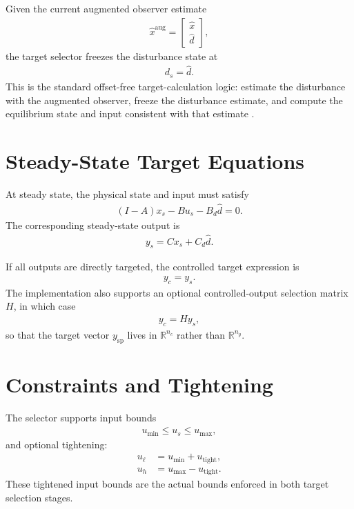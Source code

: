 \documentclass[11pt]{article}
\newcommand{\R}{\mathbb{R}}
\newcommand{\xs}{x_s}
\newcommand{\us}{u_s}
\newcommand{\ds}{d_s}
\newcommand{\ysp}{y_{\mathrm{sp}}}
\newcommand{\yexpr}{y_s}
\newcommand{\yctrl}{y_c}
\newcommand{\dhat}{\hat d}
\newcommand{\xhataug}{\hat x^{\mathrm{aug}}}
\begin{document}
Given the current augmented observer estimate
\begin{align}
    \xhataug = \begin{bmatrix} \hat x \\ \hat d \end{bmatrix},
\end{align}
the target selector freezes the disturbance state at
\begin{align}
    \ds = \dhat.
\end{align}
This is the standard offset-free target-calculation logic: estimate the
disturbance with the augmented observer, freeze the disturbance estimate, and
compute the equilibrium state and input consistent with that estimate
\cite{PannocchiaBemporad2007,MaederMorari2010,PannocchiaECC2015}.

\section{Steady-State Target Equations}
At steady state, the physical state and input must satisfy
\begin{align}
    (I-A)\xs - B\us - B_d \dhat = 0.
    \label{eq:ss_dyn}
\end{align}
The corresponding steady-state output is
\begin{align}
    \yexpr = C \xs + C_d \dhat.
    \label{eq:ss_output}
\end{align}

If all outputs are directly targeted, the controlled target expression is
\begin{align}
    \yctrl = \yexpr.
\end{align}
The implementation also supports an optional controlled-output selection matrix
$H$, in which case
\begin{align}
    \yctrl = H \yexpr,
\end{align}
so that the target vector $\ysp$ lives in $\R^{n_c}$ rather than $\R^{n_y}$.

\section{Constraints and Tightening}
The selector supports input bounds
\begin{align}
    u_{\min} \le \us \le u_{\max},
\end{align}
and optional tightening:
\begin{align}
    u_{\ell} &= u_{\min} + u_{\mathrm{tight}}, \\
    u_h &= u_{\max} - u_{\mathrm{tight}}.
\end{align}
These tightened input bounds are the actual bounds enforced in both target
selection stages.
\end{document}
